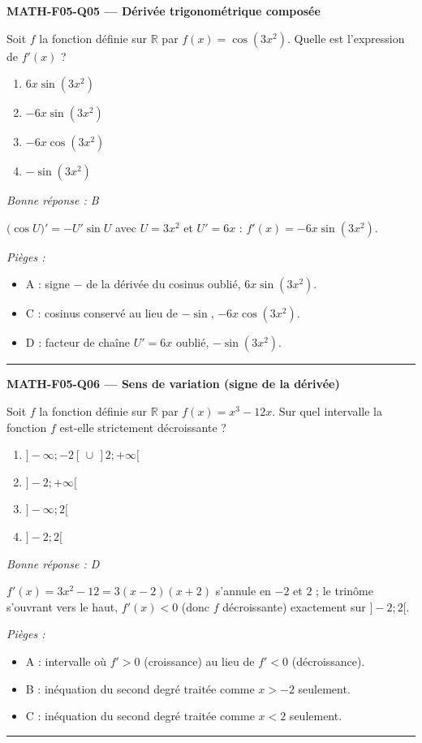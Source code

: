 \documentclass[11pt,a4paper]{article}
\newcommand{\R}{\mathbb{R}}\newcommand{\N}{\mathbb{N}}\newcommand{\Z}{\mathbb{Z}}
\begin{document}
\noindent\textbf{MATH-F05-Q05 --- Dérivée trigonométrique composée}\par
Soit $f$ la fonction définie sur $\R$ par $f(x)=\cos(3x^2)$. Quelle est l'expression de $f'(x)$ ?
\begin{enumerate}[label=\Alph*)]
\item $6x\sin(3x^2)$
\item $-6x\sin(3x^2)$
\item $-6x\cos(3x^2)$
\item $-\sin(3x^2)$
\end{enumerate}
\textit{Bonne réponse : B}\par
$\big(\cos U\big)'=-U'\sin U$ avec $U=3x^2$ et $U'=6x$ : $f'(x)=-6x\sin(3x^2)$.\par
\textit{Pièges :}
\begin{itemize}
\item A : signe $-$ de la dérivée du cosinus oublié, $6x\sin(3x^2)$.
\item C : cosinus conservé au lieu de $-\sin$, $-6x\cos(3x^2)$.
\item D : facteur de chaîne $U'=6x$ oublié, $-\sin(3x^2)$.
\end{itemize}
\vspace{8pt}\hrule\vspace{8pt}

\noindent\textbf{MATH-F05-Q06 --- Sens de variation (signe de la dérivée)}\par
Soit $f$ la fonction définie sur $\R$ par $f(x)=x^3-12x$. Sur quel intervalle la fonction $f$ est-elle strictement décroissante ?
\begin{enumerate}[label=\Alph*)]
\item $]-\infty;-2[\,\cup\,]2;+\infty[$
\item $]-2;+\infty[$
\item $]-\infty;2[$
\item $]-2;2[$
\end{enumerate}
\textit{Bonne réponse : D}\par
$f'(x)=3x^2-12=3(x-2)(x+2)$ s'annule en $-2$ et $2$ ; le trinôme s'ouvrant vers le haut, $f'(x)<0$ (donc $f$ décroissante) exactement sur $]-2;2[$.\par
\textit{Pièges :}
\begin{itemize}
\item A : intervalle où $f'>0$ (croissance) au lieu de $f'<0$ (décroissance).
\item B : inéquation du second degré traitée comme $x>-2$ seulement.
\item C : inéquation du second degré traitée comme $x<2$ seulement.
\end{itemize}
\vspace{8pt}\hrule\vspace{8pt}
\end{document}
